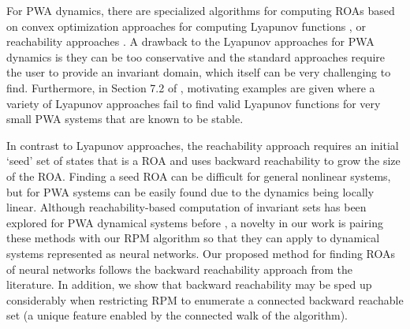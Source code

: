 For PWA dynamics, there are specialized algorithms for computing ROAs based on convex optimization approaches for computing Lyapunov functions \cite{biswas, pwa_lyap, lmi_lyap, baldi2018reachable}, or reachability approaches \cite{MPT3,pwa_lygeros}. 
A drawback to the Lyapunov approaches for PWA dynamics is they can be too conservative and the standard approaches require the user to provide an invariant domain, which itself can be very challenging to find. 
Furthermore, in Section 7.2 of \cite{biswas}, motivating examples are given where a variety of Lyapunov approaches fail to find valid Lyapunov functions for very small PWA systems that are known to be stable. 

In contrast to Lyapunov approaches, the reachability approach requires an initial `seed' set of states that is a ROA and uses backward reachability to grow the size of the ROA.
Finding a seed ROA can be difficult for general nonlinear systems, but for PWA systems can be easily found due to the dynamics being locally linear.
Although reachability-based computation of invariant sets has been explored for PWA dynamical systems before \cite{pwa_lygeros}, a novelty in our work is pairing these methods with our RPM algorithm so that they can apply to dynamical systems represented as neural networks.
Our proposed method for finding ROAs of neural networks follows the backward reachability approach from the literature. 
In addition, we show that backward reachability may be sped up considerably when restricting RPM to enumerate a connected backward reachable set (a unique feature enabled by the connected walk of the algorithm).
